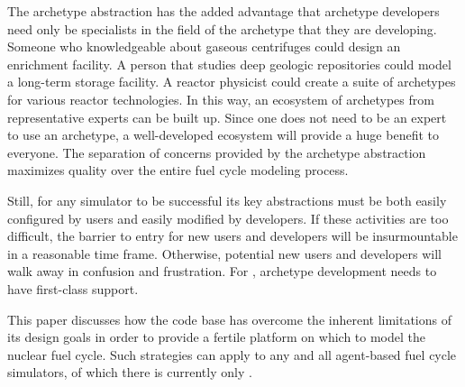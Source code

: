 The archetype abstraction has the added advantage that archetype developers 
need only be specialists in the field of the archetype that they are developing.
Someone who knowledgeable about gaseous centrifuges could design 
an enrichment facility. A person that studies deep geologic repositories
could model a long-term storage facility. A reactor physicist could create 
a suite of archetypes for various reactor technologies. In this way, an ecosystem 
of archetypes from representative experts can be built up. Since one does not need
to be an expert to use an archetype, a well-developed ecosystem will provide 
a huge benefit to everyone. The separation of concerns provided by the archetype 
abstraction maximizes quality over the entire fuel cycle modeling process.

Still, for any simulator to be successful its key abstractions must be both easily 
configured by users and easily modified by developers.  If these activities are 
too difficult, the barrier to entry for new users and developers will be 
insurmountable in a reasonable time frame. Otherwise, potential new users and developers will 
walk away in confusion and frustration. For \cyclus, archetype development
needs to have first-class support.

This paper discusses how the \cyclus code base has overcome the inherent limitations
of its design goals in order 
to provide a fertile platform on which to model the nuclear fuel cycle.
Such strategies can apply to any and all agent-based fuel cycle simulators, of which 
there is currently only \cyclus.
